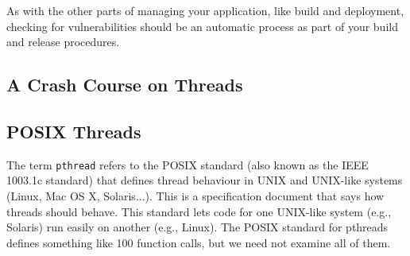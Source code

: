 \documentclass[a4paper]{report}
\begin{document}
As with the other parts of managing your application, like build and deployment, checking for vulnerabilities should be an automatic process as part of your build and release procedures. 









\begin{appendices}




\chapter{A Crash Course on Threads}

\section*{POSIX Threads}

The term \texttt{pthread} refers to the POSIX standard (also known as the IEEE 1003.1c standard) that defines thread behaviour in UNIX and UNIX-like systems (Linux, Mac OS X, Solaris...). This is a specification document that says how threads should behave. This standard lets code for one UNIX-like system (e.g., Solaris) run easily on another (e.g., Linux). The POSIX standard for pthreads defines something like 100 function calls, but we need not examine all of them. 


\end{appendices}
\end{document}
